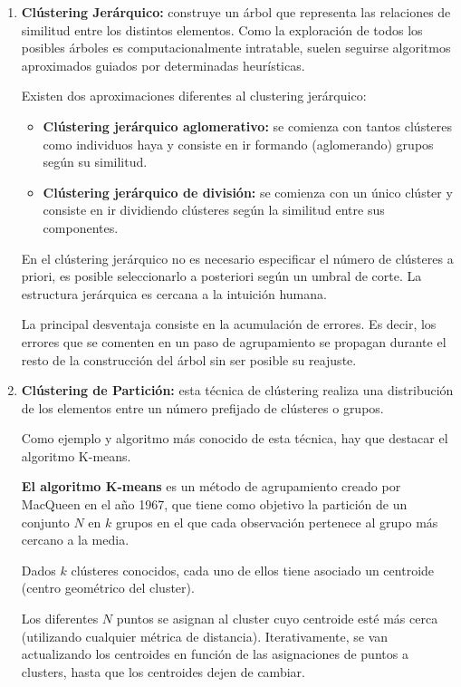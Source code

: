 \documentclass[a4paper, 11pt]{article} %
\begin{document}
\begin{enumerate}
    \item \textbf{Clústering Jerárquico:}  construye un árbol que representa las relaciones de similitud entre los distintos elementos. Como la exploración de todos los posibles árboles es computacionalmente intratable, suelen seguirse algoritmos aproximados guiados por determinadas heurísticas.

    Existen dos aproximaciones diferentes al clustering jerárquico:
    \begin{itemize}
        \item \textbf{Clústering jerárquico aglomerativo:} se comienza con tantos clústeres como individuos haya y consiste en ir formando (aglomerando) grupos según su similitud.
        \item \textbf{Clústering jerárquico de división:} se comienza con un único clúster y consiste en ir dividiendo clústeres según la similitud entre sus componentes.
    \end{itemize}

En el clústering jerárquico no es necesario especificar el número de clústeres a priori, es posible seleccionarlo a posteriori según un umbral de corte. La estructura jerárquica es cercana a la intuición humana.

La principal desventaja consiste en la acumulación de errores. Es decir, los errores que se comenten en un paso de agrupamiento se propagan durante el resto de la construcción del árbol sin ser posible su reajuste. \\






    \item \textbf{Clústering de Partición:}
    esta técnica de clústering realiza una distribución de los elementos entre un número prefijado de clústeres o grupos.

    Como ejemplo y algoritmo más conocido de esta técnica, hay que destacar el algoritmo K-means.

    \textbf{El algoritmo K-means} es un método de agrupamiento creado por MacQueen en el año 1967, que tiene como objetivo la partición de un conjunto $N$ en $k$ grupos en el que cada observación pertenece al grupo más cercano a la media.

    Dados $k$ clústeres conocidos, cada uno de ellos tiene asociado un centroide (centro geométrico del cluster).

    Los diferentes $N$ puntos  se asignan al cluster cuyo centroide esté más cerca (utilizando cualquier métrica de distancia). Iterativamente, se van actualizando los centroides en función de las asignaciones de puntos a clusters, hasta que los centroides dejen de cambiar.


\end{enumerate}
\end{document}
